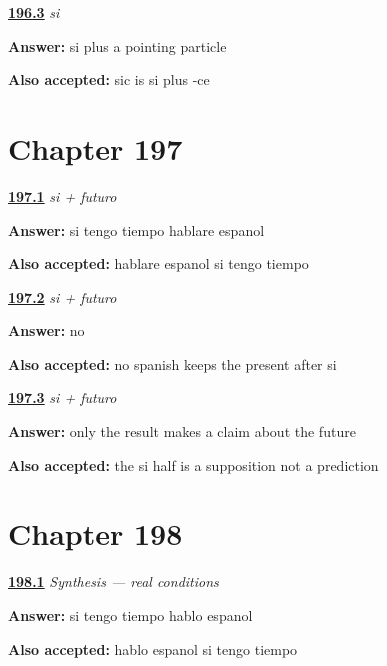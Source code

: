 \noindent\begin{minipage}[t]{\linewidth}
\raggedright
\hyperlink{review-ES-C55-si-etymon}{\textbf{196.3}} \emph{si}\par
\small \textbf{Answer:} si plus a pointing particle\par
\footnotesize \textbf{Also accepted:} sic is si plus -ce
\end{minipage}\par\medskip

\section*{Chapter 197}

\noindent\begin{minipage}[t]{\linewidth}
\raggedright
\hyperlink{review-ES-C55-si-futuro-say}{\textbf{197.1}} \emph{si + futuro}\par
\small \textbf{Answer:} si tengo tiempo hablare espanol\par
\footnotesize \textbf{Also accepted:} hablare espanol si tengo tiempo
\end{minipage}\par\medskip

\noindent\begin{minipage}[t]{\linewidth}
\raggedright
\hyperlink{review-ES-C55-si-futuro-trap}{\textbf{197.2}} \emph{si + futuro}\par
\small \textbf{Answer:} no\par
\footnotesize \textbf{Also accepted:} no spanish keeps the present after si
\end{minipage}\par\medskip

\noindent\begin{minipage}[t]{\linewidth}
\raggedright
\hyperlink{review-ES-C55-si-futuro-why}{\textbf{197.3}} \emph{si + futuro}\par
\small \textbf{Answer:} only the result makes a claim about the future\par
\footnotesize \textbf{Also accepted:} the si half is a supposition not a prediction
\end{minipage}\par\medskip

\section*{Chapter 198}

\noindent\begin{minipage}[t]{\linewidth}
\raggedright
\hyperlink{review-ES-C55-sintesis-condicion-habit}{\textbf{198.1}} \emph{Synthesis — real conditions}\par
\small \textbf{Answer:} si tengo tiempo hablo espanol\par
\footnotesize \textbf{Also accepted:} hablo espanol si tengo tiempo
\end{minipage}\par\medskip

